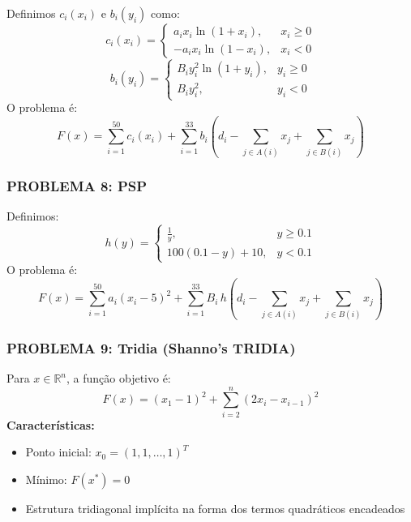 \documentclass[12pt,a4paper]{article}
\begin{document}
Definimos $c_i(x_i)$ e $b_i(y_i)$ como:
\begin{equation}
c_i(x_i) = \begin{cases}
a_i x_i \ln(1+x_i), & x_i \geq 0 \\
-a_i x_i \ln(1-x_i), & x_i < 0
\end{cases}
\end{equation}
\begin{equation}
b_i(y_i) = \begin{cases}
B_i y_i^2 \ln(1+y_i), & y_i \geq 0 \\
B_i y_i^2, & y_i < 0
\end{cases}
\end{equation}
O problema é:
\begin{equation}
F(x) = \sum_{i=1}^{50} c_i(x_i) + \sum_{i=1}^{33} b_i\left(d_i - \sum_{j \in A(i)} x_j + \sum_{j \in B(i)} x_j \right)
\end{equation}

\subsubsection{\textbf{PROBLEMA 8: PSP}}

Definimos:
\begin{equation}
h(y) = \begin{cases}
\frac{1}{y}, & y \geq 0.1 \\
100(0.1 - y) + 10, & y < 0.1
\end{cases}
\end{equation}
O problema é:
\begin{equation}
F(x) = \sum_{i=1}^{50} a_i (x_i - 5)^2 + \sum_{i=1}^{33} B_i \, h\left(d_i - \sum_{j \in A(i)} x_j + \sum_{j \in B(i)} x_j \right)
\end{equation}

\subsubsection{\textbf{PROBLEMA 9: Tridia (Shanno's TRIDIA)}}

Para $x \in \mathbb{R}^n$, a função objetivo é:
\begin{equation}
F(x) = (x_1 - 1)^2 + \sum_{i=2}^{n} (2x_i - x_{i-1})^2
\end{equation}
\textbf{Características:}
\begin{itemize}
\item Ponto inicial: $x_0 = (1, 1, \dots, 1)^T$
\item Mínimo: $F(x^*) = 0$
\item Estrutura tridiagonal implícita na forma dos termos quadráticos encadeados
\end{itemize}
\end{document}
